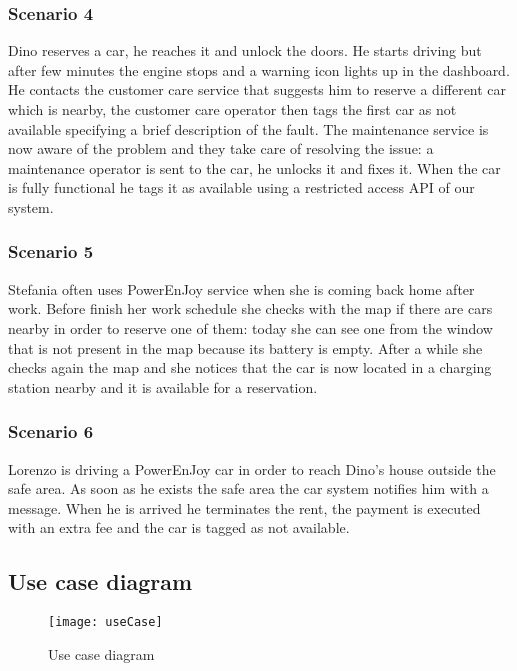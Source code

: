 \subsubsection{Scenario 4}
\label{scenario:4}
Dino reserves a car, he reaches it and unlock the doors. He starts driving but after few minutes the engine stops and a warning icon lights up in the dashboard. He contacts the customer care service that suggests him to reserve a different car which is nearby, the customer care operator then tags the first car as not available specifying a brief description of the fault. The maintenance service is now aware of the problem and they take care of resolving the issue: a maintenance operator is sent to the car, he unlocks it  and fixes it. When the car is fully functional he tags it as available using a restricted access API of our system.

\subsubsection{Scenario 5}
\label{scenario:5}
Stefania often uses PowerEnJoy service when she is coming back home after work. Before finish her work schedule she checks with the map if there are cars nearby in order to reserve one of them: today she can see one from the window that is not present in the map because its battery is empty. After a while she checks again the map and she notices that the car is now located in a charging station nearby and it is available for a reservation.
	
\subsubsection{Scenario 6}
\label{scenario:6}
Lorenzo is driving a PowerEnJoy car in order to reach Dino's house outside the safe area. As soon as he exists the safe area the car system notifies him with a message. When he is arrived he terminates the rent, the payment is executed with an extra fee and the car is tagged as not available.

\clearpage
\subsection{Use case diagram}

\begin{figure}[h!]
	\centering
	\texttt{[image: useCase]}
	\caption{
		\label{fig:useCase} 
		Use case diagram
	}
\end{figure}
\clearpage

